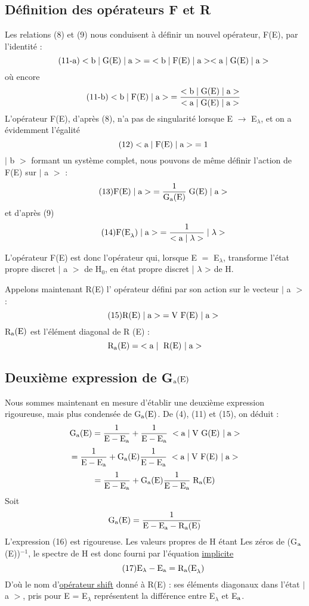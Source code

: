 \subsection{Définition des opérateurs F et R}%
Les relations (8) et (9) nous conduisent à définir un nouvel opérateur, F(E), par l'identité :
\[
\tag{11-a}<\text{b}\;|\;\text{G(E)}\;|\;\text{a}>\;=\;<\text{b}\;|\;\text{F(E)}\;|\;\text{a}><\text{a}\;|\;\text{G(E)}\;|\;\text{a}>
\]
où encore
\[
\tag{11-b}<\text{b}\;|\;\text{F(E)}\;|\;\text{a}>\;=\frac{<\text{b}\;|\;\text{G(E)}\;|\;\text{a}>}{<\text{a}\;|\;\text{G(E)}\;|\;\text{a}>}
\]
L'opérateur F(E), d'après (8), n'a pas de singularité lorsque E $\to$ E$_\lambda$, et on a évidemment l'égalité
\[
\tag{12}<\text{a}\;|\;\text{F(E)}\;|\;\text{a}>\;=1
\]
$|$ b $>$ formant un système complet, nous pouvons de même définir l'action de F(E) sur $|$ a $>$ :
\[
\tag{13}\text{F(E)}\;|\;\text{a}>\;=\frac{1}{\text{G}_{\text{a}}\text{(E)}}\;\text{G(E)}\;|\;\text{a}>
\]
et d'après (9)
\[
\tag{14}\text{F(E}_\lambda)\;|\;\text{a}>\;=\frac{1}{<\text{a}\;|\;\lambda>}\;|\;\lambda>
\]

L'opérateur F(E) est donc l'opérateur qui, lorsque E $=$ E$_\lambda$, transforme l'état
propre discret $|$ a $>$ de H$_0$, en état propre discret | $\lambda$ > de H.

Appelons maintenant R(E) l' opérateur défini par son action sur le
vecteur $|$ a $>$ :
\[
\tag{15}\text{R(E)}\;|\;\text{a}>\;=\text{V F(E) }|\;\text{a}>
\]
R$_{\text{a}}\text{(E)}$ est l'élément diagonal de R (E) :
\[
\text{R}_{\text{a}}\text{(E)}=\;<\text{a}\;|\;\text{ R(E) }|\;\text{a}>
\]
\subsection{Deuxième expression de G$_{\text{a}}\text{(E)}$}%
Nous sommes maintenant en mesure d'établir une deuxième expression
rigoureuse, mais plus condensée de G$_{\text{a}}\text{(E)}$.
De (4), (11) et (15), on déduit :
\[
\text{G}_{\text{a}}\text{(E)}=\frac{1}{\text{E}-\text{E}_{\text{a}}}+\frac{1}{\text{E}-\text{E}_{\text{a}}}\;<\text{a}\;|\;\text{V G(E) }|\;\text{a}>
\]
\[
=\frac{1}{\text{E}-\text{E}_{\text{a}}}+\text{G}_{\text{a}}\text{(E)}\frac{1}{\text{E}-\text{E}_{\text{a}}}\;<\text{a}\;|\;\text{V F(E) }|\;\text{a}>
\]
\[
=\frac{1}{\text{E}-\text{E}_{\text{a}}}+\text{G}_{\text{a}}\text{(E)}\frac{1}{\text{E}-\text{E}_{\text{a}}}\;\text{R}_{\text{a}}\text{(E)}
\]
Soit
\[
\text{G}_{\text{a}}\text{(E)}=\frac{1}{\text{E}-\text{E}_{\text{a}}-\text{R}_{\text{a}}\text{(E)}}
\]
L'expression (16) est rigoureuse. Les valeurs propres de H étant Les zéros de
(G$_{\text{a}}$(E))$^{-1}$, le spectre de H est donc fourni par l'équation \ul{implicite}
\[
\tag{17}\text{E}_\lambda-\text{E}_{\text{a}}=\text{R}_{\text{a}}\text{(E}_\lambda)
\]
D'où le nom d'\ul{opérateur shift} donné à R(E) : ses éléments diagonaux dans l'état
$|$ a $>$, pris pour E = E$_\lambda$ représentent la différence entre E$_\lambda$ et E$_{\text{a}}$.

